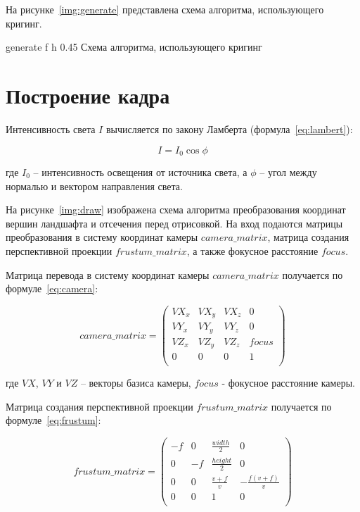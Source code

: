 На рисунке~\ref{img:generate} представлена схема алгоритма, использующего кригинг.

\FloatBarrier
{}
{generate} %
{f} %
{h} %
{0.45\textwidth} %
{Схема алгоритма, использующего кригинг} %
\FloatBarrier
 
\section{Построение кадра}

Интенсивность света $I$ вычисляется по закону Ламберта (формула~\ref{eq:lambert}):

\begin{equation}
	\label{eq:lambert}
	I = I_0 \cos{\phi}
\end{equation}

\noindent где $I_0$ -- интенсивность освещения от источника света, а $\phi$ -- угол между нормалью и вектором направления света.

На рисунке~\ref{img:draw} изображена схема алгоритма преобразования координат вершин ландшафта и отсечения перед отрисовкой. На вход подаются матрицы преобразования в систему координат камеры $camera\_matrix$, матрица создания перспективной проекции $frustum\_matrix$, а также фокусное расстояние $focus$.

Матрица перевода в систему координат камеры $camera\_matrix$ получается по формуле~\ref{eq:camera}:

\begin{equation}
	\label{eq:camera}
	camera\_matrix = \begin{pmatrix}
		VX_x & VX_y & VX_z & 0     \\
		VY_x & VY_y & VY_z & 0     \\
		VZ_x & VZ_y & VZ_z & focus \\
		0    & 0    & 0    & 1     \\
	\end{pmatrix}
\end{equation}

\noindent где $VX$, $VY$ и $VZ$ -- векторы базиса камеры, $focus$ - фокусное расстояние камеры.

Матрица создания перспективной проекции $frustum\_matrix$ получается по формуле~\ref{eq:frustum}:

\begin{equation}
	\label{eq:frustum}
	frustum\_matrix = \begin{pmatrix}
		-f & 0      & \frac{width}{2}  & 0     \\
		0      & -f & \frac{height}{2} & 0     \\
		0      & 0      & \frac{v + f}{v} & - \frac{f(v + f)}{v}\\
		0      & 0      & 1                & 0     \\
	\end{pmatrix}
\end{equation}

